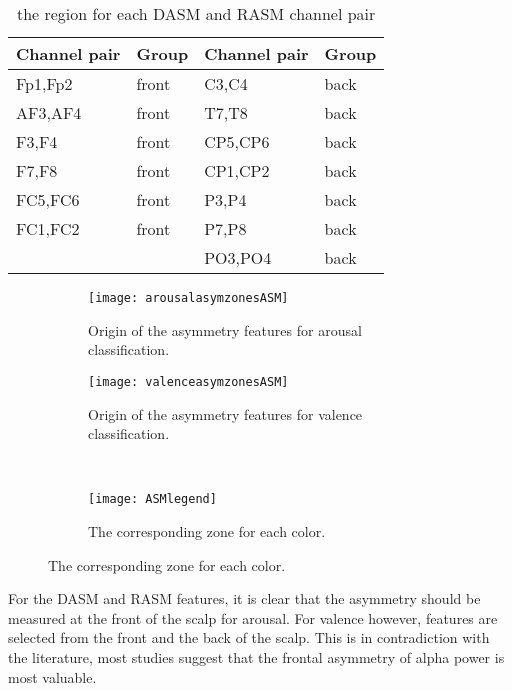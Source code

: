 \begin{table}[H]
\centering
\begin{tabular}{ll|ll}
\textbf{Channel pair} & \textbf{Group} & \textbf{Channel pair} & \textbf{Group} \\ \hline
Fp1,Fp2               & front          & C3,C4                 & back           \\
AF3,AF4               & front          & T7,T8                 & back           \\
F3,F4                 & front          & CP5,CP6               & back           \\
F7,F8                 & front          & CP1,CP2               & back           \\
FC5,FC6               & front          & P3,P4                 & back           \\
FC1,FC2               & front          & P7,P8                 & back           \\
                      &                & PO3,PO4               & back          
\end{tabular}
\caption{the region for each DASM and RASM channel pair\label{ASMgroupTable}}
\end{table}

\begin{figure}[H]
\centering
  \begin{subfigure}[b]{.4\textwidth}
    \texttt{[image: arousalasymzonesASM]}
    \caption{Origin of the asymmetry features for arousal classification.\label{arousalasymzonesASM}}
  \end{subfigure}
\hfill
  \begin{subfigure}[b]{.4\textwidth}
    \texttt{[image: valenceasymzonesASM]}
    \caption{Origin of the asymmetry features for valence classification.\label{valenceasymzonesASM}}
  \end{subfigure}
\\
  \begin{subfigure}[b]{.4\textwidth}
    \texttt{[image: ASMlegend]}
    \caption{The corresponding zone for each color.\label{ASMlegend}}
  \end{subfigure}
\end{figure}

For the DASM and RASM features, it is clear that the asymmetry should be measured at the front of the scalp for arousal. For valence however, features are selected from the front and the back of the scalp. This is in contradiction with the literature, most studies suggest that the frontal asymmetry of alpha power is most valuable.

